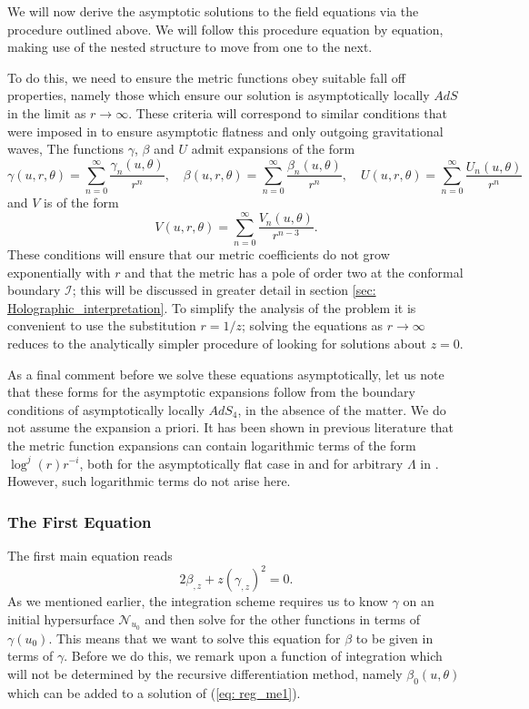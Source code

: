 \documentclass[a4paper,11pt]{article}
\numberwithin{equation}{section}
\begin{document}
We will now derive the asymptotic solutions to the field equations via the procedure outlined above. We will follow this procedure equation by equation, making use of the nested structure to move from one to the next. 

To do this, we need to ensure the metric functions obey suitable fall off properties, namely those which ensure our solution is asymptotically locally $AdS$ in the limit as $r \rightarrow \infty$. These criteria will correspond to similar conditions that were imposed in \cite{Bondi:1962px} to ensure asymptotic flatness and only outgoing gravitational waves, The functions $\gamma$, $\beta$ and $U$ admit expansions of the form 
\begin{equation}
\gamma(u,r,\theta)=\sum_{n=0}^{\infty}\frac{\gamma_n(u,\theta)}{r^n}, \quad \beta(u,r,\theta)=\sum_{n=0}^{\infty}\frac{\beta_n(u,\theta)}{r^n}, \quad U(u,r,\theta)=\sum_{n=0}^{\infty}\frac{U_n(u,\theta)}{r^n} 
\end{equation}
and $V$ is of the form 
\begin{equation}
V(u, r, \theta)=\sum_{n=0}^{\infty} \frac {V_n(u, \theta)}{r^{n-3}}.
\end{equation}
These conditions will ensure that our metric coefficients do not grow exponentially with $r$ and that the metric has a pole of order two at the conformal boundary $\mathscr{I}$; this will be discussed in greater detail in section \ref{sec: Holographic_interpretation}.  
To simplify the analysis of the problem it is convenient to use the substitution $r=1/z$; solving the equations as $r \rightarrow \infty$ reduces to the analytically simpler procedure of looking for solutions about $z=0$. 

As a final comment before we solve these equations asymptotically, let us note that these forms for the asymptotic expansions follow from the boundary conditions of asymptotically locally $AdS_4$, in the absence of the matter. We do not assume the expansion a priori.
It has been shown in previous literature that the metric function expansions can contain logarithmic terms of the form $\log^j(r)r^{-i}$, both for the asymptotically flat case in \cite{Andersson:1994ng, 0264-9381-16-5-314} and for arbitrary $\Lambda$ in \cite{Chrusciel:2016oux}. However, such logarithmic terms do not arise here. 


\subsubsection{The First Equation}
\noindent The first main equation reads  
\begin{equation} \label{eq: reg_me1}
2 \beta_{,z}+ z (\gamma_{,z})^2=0.
\end{equation}
As we mentioned earlier, the integration scheme requires us to know $\gamma$ on an initial hypersurface $\mathcal{N}_{u_0}$ and then solve for the other functions in terms of $\gamma(u_0)$. This means that we want to solve this equation for $\beta$ to be given in terms of $\gamma$. Before we do this, we remark upon a function of integration which will not be determined by the recursive differentiation method, namely $\beta_0(u, \theta)$ which can be added to a solution of (\ref{eq: reg_me1}). 
\end{document}
